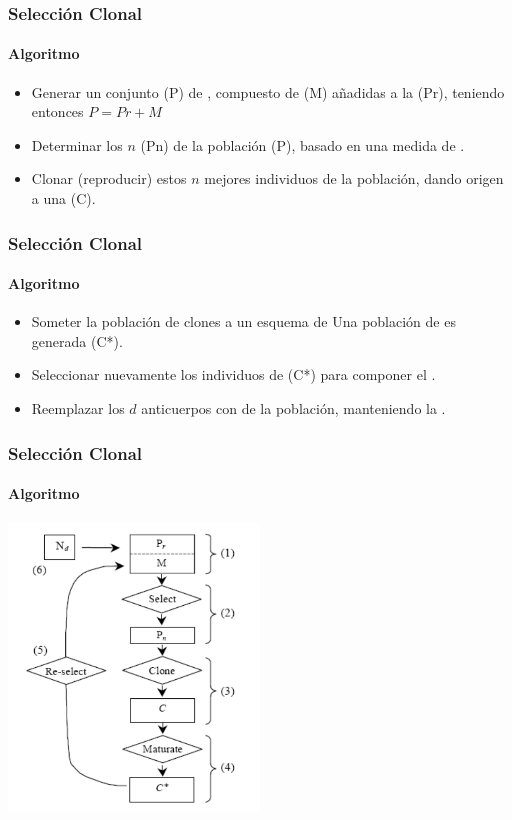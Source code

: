 \frame
{
\frametitle{Selección Clonal}
\framesubtitle{Algoritmo}

\begin{itemize}
    \item Generar un conjunto (P) de ,
		compuesto de  (M) añadidas a la
		 (Pr), teniendo entonces $P = Pr + M$
    \item Determinar los $n$  (Pn) de la población (P),
		basado en una medida de .
    \item Clonar (reproducir) estos $n$ mejores individuos de la población,
		dando origen a una  (C).
\end{itemize}
}

\frame
{
\frametitle{Selección Clonal}
\framesubtitle{Algoritmo}

\begin{itemize}
    \item Someter la población de clones a un esquema de 
		Una población de  es generada (C*).
    \item Seleccionar nuevamente los  individuos de (C*)
		para componer el .
    \item Reemplazar los $d$ anticuerpos con  de la población,
		manteniendo la .
\end{itemize}

}

\frame
{
\frametitle{Selección Clonal}
\framesubtitle{Algoritmo}
\begin{center}
\includegraphics[width=0.5\textwidth]{../doc/img/algoritmo}
\end{center}
}
